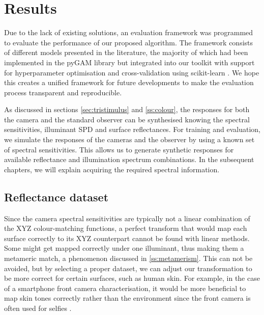 \chapter{Results}%
\label{ch:results}

Due to the lack of existing solutions, an evaluation framework was programmed to evaluate the performance of our proposed algorithm. The framework consists of different models presented in the literature, the majority of which had been implemented in the pyGAM \cite{serven2018pygam} library but integrated into our toolkit with support for hyperparameter optimisation and cross-validation using scikit-learn \cite{scikit-learn}. We hope this creates a unified framework for future developments to make the evaluation process transparent and reproducible.


As discussed in sections \ref{sec:tristimulus} and \ref{ss:colour}, the responses for both the camera and the standard observer can be synthesised knowing the spectral sensitivities, illuminant SPD and surface reflectances. For training and evaluation, we simulate the responses of the cameras and the observer by using a known set of spectral sensitivities. This allows us to generate synthetic responses for available reflectance and illumination spectrum combinations. In the subsequent chapters, we will explain acquiring the required spectral information.

\section{Reflectance dataset}
\label{sec:data}
Since the camera spectral sensitivities are typically not a linear combination of the XYZ colour-matching functions, a perfect transform that would map each surface correctly to its XYZ counterpart cannot be found with linear methods. Some might get mapped correctly under one illuminant, thus making them a metameric match, a phenomenon discussed in \ref{ss:metamerism}. This can not be avoided, but by selecting a proper dataset, we can adjust our transformation to be more correct for certain surfaces, such as human skin. For example, in the case of a smartphone front camera characterisation, it would be more beneficial to map skin tones correctly rather than the environment since the front camera is often used for selfies \cite{imatest2024skin}. 

